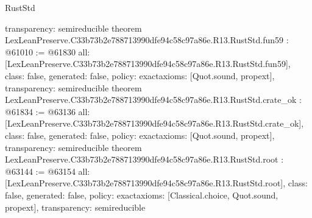 \begin{lexlean}{RustStd}
\begin{coremodule}
{  transparency: semireducible
}
theorem LexLeanPreserve.C33b73b2e788713990dfe94c58c97a86e.R13.RustStd.fun59 : @61010 := @61830 {
  all: [LexLeanPreserve.C33b73b2e788713990dfe94c58c97a86e.R13.RustStd.fun59],
  class: false,
  generated: false,
  policy: exact{axioms: [Quot.sound, propext]},
  transparency: semireducible
}
theorem LexLeanPreserve.C33b73b2e788713990dfe94c58c97a86e.R13.RustStd.crate_ok : @61834 := @63136 {
  all: [LexLeanPreserve.C33b73b2e788713990dfe94c58c97a86e.R13.RustStd.crate_ok],
  class: false,
  generated: false,
  policy: exact{axioms: [Quot.sound, propext]},
  transparency: semireducible
}
theorem LexLeanPreserve.C33b73b2e788713990dfe94c58c97a86e.R13.RustStd.root : @63144 := @63154 {
  all: [LexLeanPreserve.C33b73b2e788713990dfe94c58c97a86e.R13.RustStd.root],
  class: false,
  generated: false,
  policy: exact{axioms: [Classical.choice, Quot.sound, propext]},
  transparency: semireducible
}


\end{coremodule}
\end{lexlean}
